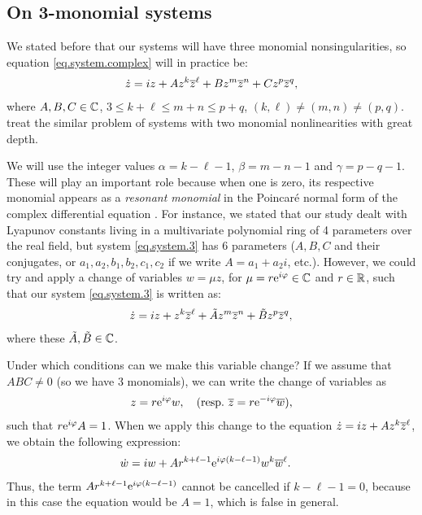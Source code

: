 \subsection{On 3-monomial systems}
\label{sec.3mono.resonant}

We stated before that our systems will have three monomial nonsingularities, so equation \eqref{eq.system.complex} will in practice be:
\begin{align}
\dot z = iz + Az^k\overline{z}^\ell+Bz^m\overline{z}^n+Cz^p\overline{z}^q,
\label{eq.system.3}
\end{align}
where $A,B,C\in\mathbb{C}$, $3\le k+\ell\le m+n\le p+q$, $(k,\ell)\ne(m,n)\ne(p,q)$. \textcite{Gasull2016} treat the similar problem of systems with two monomial nonlinearities with great depth.

We will use the integer values $\alpha=k-\ell-1$, $\beta=m-n-1$ and $\gamma=p-q-1$. These will play an important role because when one is zero, its respective monomial appears as a \emph{resonant monomial} in the Poincaré normal form of the complex differential equation \parencite{Gasull2016}. For instance, we stated that our study dealt with Lyapunov constants living in a multivariate polynomial ring of 4 parameters over the real field, but system \eqref{eq.system.3} has 6 parameters ($A,B,C$ and their conjugates, or $a_1,a_2,b_1,b_2,c_1,c_2$ if we write $A=a_1+a_2i$, etc.). However, we could try and apply a change of variables $w=\mu z$, for $\mu=r\mathrm{e}^{i \varphi}\in\mathbb{C}$ and $r\in\mathbb{R}$, such that our system \eqref{eq.system.3} is written as:
\begin{align}
\dot z = iz + z^k\overline{z}^\ell+\tilde Az^m\overline{z}^n+\tilde Bz^p\overline{z}^q,
\label{eq.system.3.4p}
\end{align}
where these $\tilde A,\tilde B\in\mathbb{C}$.

Under which conditions can we make this variable change? If we assume that $ABC\ne0$ (so we have 3 monomials), we can write the change of variables as
\begin{align*}
z=r\mathrm{e}^{i \varphi}w,\quad(\mathrm{resp.}~\overline{z}=r\mathrm{e}^{-i \varphi}\overline w),
\end{align*}
such that $r\mathrm{e}^{i \varphi}A=1$. When we apply this change to the equation $\dot z=iz+Az^k\overline{z}^\ell$, we obtain the following expression:
\begin{align*}
\dot w &= iw+Ar^{k+\ell-1}\mathrm{e}^{i \varphi (k-\ell-1)}w^k\overline w^\ell.
\end{align*}
Thus, the term $Ar^{k+\ell-1}\mathrm{e}^{i \varphi(k-\ell-1)}$ cannot be cancelled if $k-\ell-1=0$, because in this case the equation would be $A=1$, which is false in general.

